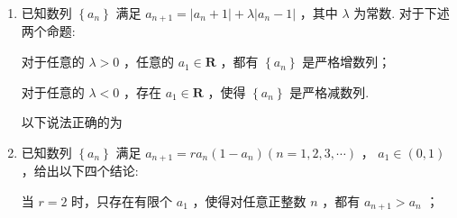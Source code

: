 \begin{enumerate}
\begin{enumerate}
\begin{jieda}
            因此选B，对应的$M = 6$.
        \end{jieda}

        \item 已知数列 $\left\{  {a}_{n}\right\}$ 满足 ${a}_{n + 1} = \left| {{a}_{n} + 1}\right|  + \lambda \left| {{a}_{n} - 1}\right|$ ，其中 $\lambda$ 为常数. 对于下述两个命题:

          对于任意的 $\lambda  > 0$ ，任意的 ${a}_{1} \in  \mathbf{R}$ ，都有 $\left\{  {a}_{n}\right\}$ 是严格增数列；

          对于任意的 $\lambda  < 0$ ，存在 ${a}_{1} \in  \mathbf{R}$ ，使得 $\left\{  {a}_{n}\right\}$ 是严格减数列.

        以下说法正确的为 

        \begin{jieda}
        \end{jieda}

        \item 已知数列 $\left\{  {a}_{n}\right\}$ 满足 ${a}_{n + 1} = r{a}_{n}\left( {1 - {a}_{n}}\right) \left( {n = 1,2,3,\cdots }\right)$ ， ${a}_{1} \in  \left( {0,1}\right)$ ，给出以下四个结论:

          当 $r = 2$ 时，只存在有限个 ${a}_{1}$ ，使得对任意正整数 $n$ ，都有 ${a}_{n + 1} > {a}_{n}$ ；


\end{enumerate}
\end{enumerate}

